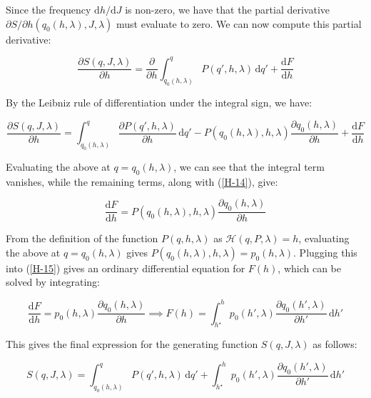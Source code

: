 Since the frequency $\mathrm{d}h/\mathrm{d}J$ is non-zero, we have that the partial derivative $\partial S/\partial h(q_0(h,\lambda),J,\lambda)$ must evaluate to zero.
We can now compute this partial derivative:

\begin{equation*}
    \frac{\partial S(q,J,\lambda)}{\partial h}=\frac{\partial }{\partial h}\int_{q_0(h,\lambda)}^q P(q',h,\lambda)\,\mathrm{d}q'+\frac{\mathrm{d}F}{\mathrm{d}h}
\end{equation*}

By the Leibniz rule of differentiation under the integral sign, we have:

\begin{equation*}
    \frac{\partial S(q,J,\lambda)}{\partial h}=\int_{q_0(h,\lambda)}^q\frac{\partial P(q',h,\lambda)}{\partial h}\,\mathrm{d}q'-P(q_0(h,\lambda),h,\lambda)\frac{\partial q_0(h,\lambda)}{\partial h}+\frac{\mathrm{d}F}{\mathrm{d}h}
\end{equation*}

Evaluating the above at $q=q_0(h,\lambda)$, we can see that the integral term vanishes, while the remaining terms, along with (\ref{H-14}), give:

\begin{equation}
    \label{H-15}
    \frac{\mathrm{d}F}{\mathrm{d}h}=P(q_0(h,\lambda),h,\lambda)\frac{\partial q_0(h,\lambda)}{\partial h}
\end{equation}

From the definition of the function $P(q,h,\lambda)$ as $\mathcal{H}(q,P,\lambda)=h$, evaluating the above at $q=q_0(h,\lambda)$ gives $P(q_0(h,\lambda),h,\lambda)=p_0(h,\lambda)$. Plugging this into (\ref{H-15}) gives an ordinary differential equation for $F(h)$, which can be solved by integrating:

\begin{equation*}
    \frac{\mathrm{d}F}{\mathrm{d}h}=p_0(h,\lambda)\frac{\partial q_0(h,\lambda)}{\partial h}\implies F(h)=\int_{h^\star}^h p_0(h',\lambda)\frac{\partial q_0(h',\lambda)}{\partial h'}\,\mathrm{d}h'
\end{equation*}

This gives the final expression for the generating function $S(q,J,\lambda)$ as follows:

\begin{equation}
    \label{H-18}
    S(q,J,\lambda)=\int_{q_0(h,\lambda)}^q P(q',h,\lambda)\,\mathrm{d}q'+\int_{h^\star}^h p_0(h',\lambda)\frac{\partial q_0(h',\lambda)}{\partial h'}\,\mathrm{d}h'
\end{equation}

